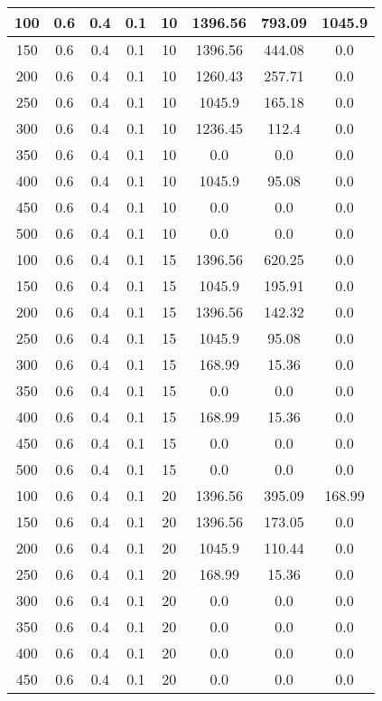 \documentclass[a4paper, 12pt]{extreport}
\begin{document}
\begin{itemize}
\begin{longtable}{|c|c|c|c|c|c|c|c|}
			100 & 0.6 & 0.4 & 0.1 & 10 & 1396.56 & 793.09 & 1045.9 \\\hline
			150 & 0.6 & 0.4 & 0.1 & 10 & 1396.56 & 444.08 & 0.0 \\\hline
			200 & 0.6 & 0.4 & 0.1 & 10 & 1260.43 & 257.71 & 0.0 \\\hline
			250 & 0.6 & 0.4 & 0.1 & 10 & 1045.9 & 165.18 & 0.0 \\\hline
			300 & 0.6 & 0.4 & 0.1 & 10 & 1236.45 & 112.4 & 0.0 \\\hline
			350 & 0.6 & 0.4 & 0.1 & 10 & 0.0 & 0.0 & 0.0 \\\hline
			400 & 0.6 & 0.4 & 0.1 & 10 & 1045.9 & 95.08 & 0.0 \\\hline
			450 & 0.6 & 0.4 & 0.1 & 10 & 0.0 & 0.0 & 0.0 \\\hline
			500 & 0.6 & 0.4 & 0.1 & 10 & 0.0 & 0.0 & 0.0 \\\hline
			100 & 0.6 & 0.4 & 0.1 & 15 & 1396.56 & 620.25 & 0.0 \\\hline
			150 & 0.6 & 0.4 & 0.1 & 15 & 1045.9 & 195.91 & 0.0 \\\hline
			200 & 0.6 & 0.4 & 0.1 & 15 & 1396.56 & 142.32 & 0.0 \\\hline
			250 & 0.6 & 0.4 & 0.1 & 15 & 1045.9 & 95.08 & 0.0 \\\hline
			300 & 0.6 & 0.4 & 0.1 & 15 & 168.99 & 15.36 & 0.0 \\\hline
			350 & 0.6 & 0.4 & 0.1 & 15 & 0.0 & 0.0 & 0.0 \\\hline
			400 & 0.6 & 0.4 & 0.1 & 15 & 168.99 & 15.36 & 0.0 \\\hline
			450 & 0.6 & 0.4 & 0.1 & 15 & 0.0 & 0.0 & 0.0 \\\hline
			500 & 0.6 & 0.4 & 0.1 & 15 & 0.0 & 0.0 & 0.0 \\\hline
			100 & 0.6 & 0.4 & 0.1 & 20 & 1396.56 & 395.09 & 168.99 \\\hline
			150 & 0.6 & 0.4 & 0.1 & 20 & 1396.56 & 173.05 & 0.0 \\\hline
			200 & 0.6 & 0.4 & 0.1 & 20 & 1045.9 & 110.44 & 0.0 \\\hline
			250 & 0.6 & 0.4 & 0.1 & 20 & 168.99 & 15.36 & 0.0 \\\hline
			300 & 0.6 & 0.4 & 0.1 & 20 & 0.0 & 0.0 & 0.0 \\\hline
			350 & 0.6 & 0.4 & 0.1 & 20 & 0.0 & 0.0 & 0.0 \\\hline
			400 & 0.6 & 0.4 & 0.1 & 20 & 0.0 & 0.0 & 0.0 \\\hline
			450 & 0.6 & 0.4 & 0.1 & 20 & 0.0 & 0.0 & 0.0 \\\hline

\end{longtable}
\end{itemize}
\end{document}
